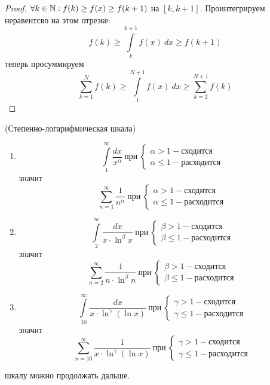 \begin{proof}
    $\forall k\in \mathbb{N}: f(k)\geq f(x)\geq f(k+1)$ на $[k, k+1]$. Проинтегрируем неравентсво на этом отрезке:
    \[f(k)\geq \int\limits_{k}^{k+1}f(x)\ dx\geq f(k+1)\]
    теперь просуммируем
    \[\sum_{k=1}^{N}f(k)\geq \int\limits_{1}^{N+1}f(x)\ dx\geq \sum_{k=2}^{N+1}f(k)\]
\end{proof}
\newpage
\begin{example}(Степенно-логарифмическая шкала)
    \begin{enumerate}
        \item 
    \[\int\limits_{1}^{\infty}\frac{dx}{x^{\alpha}}\ \text{при}\ 
    \begin{cases}
        \alpha>1 - \text{сходится}\\
        \alpha\leq 1 - \text{расходится}
    \end{cases}\]
    значит
    \[\sum_{n=1}^{\infty}\frac{1}{n^{\alpha}}\ \text{при}\ 
    \begin{cases}
        \alpha>1 - \text{сходится}\\
        \alpha\leq 1 - \text{расходится}
    \end{cases}\]
    \item
    \[\int\limits_{2}^{\infty}\frac{dx}{x\cdot \ln^{\beta}{x}}\ \text{при}\ 
    \begin{cases}
        \beta>1 - \text{сходится}\\
        \beta\leq 1 - \text{расходится}
    \end{cases}\]
    значит
    \[\sum_{n=2}^{\infty}\frac{1}{n\cdot \ln^{\beta}{n}}\ \text{при}\ 
    \begin{cases}
        \beta>1 - \text{сходится}\\
        \beta\leq 1 - \text{расходится}
    \end{cases}\]
    \item
    \[\int\limits_{10}^{\infty}\frac{dx}{x\cdot \ln^{\gamma}{(\ln{x})}}\ \text{при}\ 
    \begin{cases}
        \gamma>1 - \text{сходится}\\
        \gamma\leq 1 - \text{расходится}
    \end{cases}\]
    значит
    \[\sum_{n=10}^{\infty}\frac{1}{x\cdot \ln^{\gamma}({\ln{x}})}\ \text{при}\ 
    \begin{cases}
        \gamma>1 - \text{сходится}\\
        \gamma\leq 1 - \text{расходится}
    \end{cases}\]
    \end{enumerate}
    шкалу можно продолжать дальше.
\end{example}
